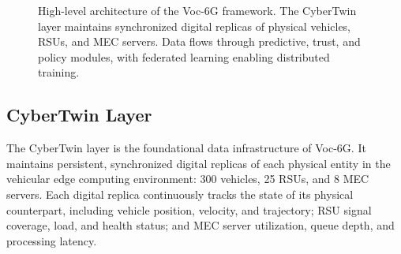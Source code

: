 \documentclass[10pt,letterpaper]{article}
\providecommand{\VocSixG}{Voc-6G}
\begin{document}
\begin{figure}[t]
{
}%
\caption{High-level architecture of the \VocSixG{} framework. The CyberTwin layer maintains synchronized digital replicas of physical vehicles, RSUs, and MEC servers. Data flows through predictive, trust, and policy modules, with federated learning enabling distributed training.}
\label{fig:architecture}
\end{figure}

\subsection*{CyberTwin Layer}
\label{sec:cybertwin}

The CyberTwin layer is the foundational data infrastructure of \VocSixG{}. It maintains persistent, synchronized digital replicas of each physical entity in the vehicular edge computing environment: 300 vehicles, 25 RSUs, and 8 MEC servers. Each digital replica continuously tracks the state of its physical counterpart, including vehicle position, velocity, and trajectory; RSU signal coverage, load, and health status; and MEC server utilization, queue depth, and processing latency.
\end{document}
